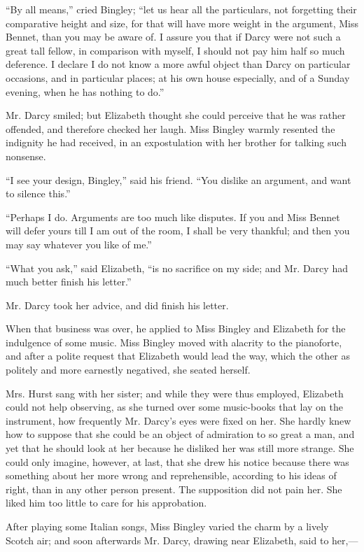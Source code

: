 ``By all means,'' cried Bingley; ``let us hear all the particulars, not forgetting their comparative height and size, for that will have more weight in the argument, Miss Bennet, than you may be aware of. I assure you that if Darcy were not such a great tall fellow, in comparison with myself, I should not pay him half so much deference. I declare I do not know a more awful object than Darcy on particular occasions, and in particular places; at his own house especially, and of a Sunday evening, when he has nothing to do.''

Mr. Darcy smiled; but Elizabeth thought she could perceive that he was rather offended, and therefore checked her laugh. Miss Bingley warmly resented the indignity he had received, in an expostulation with her brother for talking such nonsense.

``I see your design, Bingley,'' said his friend. ``You dislike an argument, and want to silence this.''

``Perhaps I do. Arguments are too much like disputes. If you and Miss Bennet will defer yours till I am out of the room, I shall be very thankful; and then you may say whatever you like of me.''

``What you ask,'' said Elizabeth, ``is no sacrifice on my side; and Mr. Darcy had much better finish his letter.''

Mr. Darcy took her advice, and did finish his letter.

When that business was over, he applied to Miss Bingley and Elizabeth for the indulgence of some music. Miss Bingley moved with alacrity to the pianoforte, and after a polite request that Elizabeth would lead the way, which the other as politely and more earnestly negatived, she seated herself.

Mrs. Hurst sang with her sister; and while they were thus employed, Elizabeth could not help observing, as she turned over some music-books that lay on the instrument, how frequently Mr. Darcy's eyes were fixed on her. She hardly knew how to suppose that she could be an object of admiration to so great a man, and yet that he should look at her because he disliked her was still more strange. She could only imagine, however, at last, that she drew his notice because there was something about her more wrong and reprehensible, according to his ideas of right, than in any other person present. The supposition did not pain her. She liked him too little to care for his approbation.

After playing some Italian songs, Miss Bingley varied the charm by a lively Scotch air; and soon afterwards Mr. Darcy, drawing near Elizabeth, said to her,---

